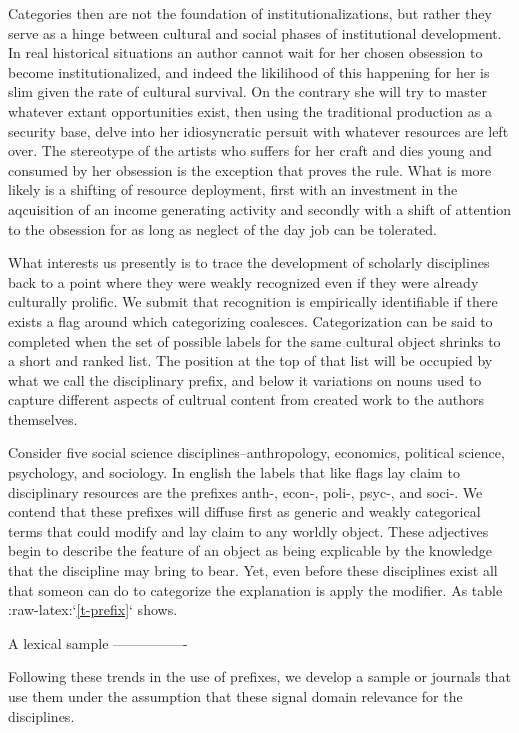 Categories then are not the foundation of institutionalizations, but
rather they serve as a hinge between cultural and social phases of
institutional development. In real historical situations an author
cannot wait for her chosen obsession to become institutionalized, and
indeed the likilihood of this happening for her is slim given the rate
of cultural survival. On the contrary she will try to master whatever
extant opportunities exist, then using the traditional production as a
security base, delve into her idiosyncratic persuit with whatever
resources are left over. The stereotype of the artists who suffers for
her craft and dies young and consumed by her obsession is the exception
that proves the rule. What is more likely is a shifting of resource
deployment, first with an investment in the aqcuisition of an income
generating activity and secondly with a shift of attention to the
obsession for as long as neglect of the day job can be tolerated.

What interests us presently is to trace the development of scholarly
disciplines back to a point where they were weakly recognized even if
they were already culturally prolific. We submit that recognition is
empirically identifiable if there exists a flag around which
categorizing coalesces. Categorization can be said to completed when the
set of possible labels for the same cultural object shrinks to a short
and ranked list. The position at the top of that list will be occupied
by what we call the disciplinary prefix, and below it variations on
nouns used to capture different aspects of cultrual content from created
work to the authors themselves.

Consider five social science disciplines--anthropology, economics,
political science, psychology, and sociology. In english the labels that
like flags lay claim to disciplinary resources are the prefixes anth-,
econ-, poli-, psyc-, and soci-. We contend that these prefixes will
diffuse first as generic and weakly categorical terms that could modify
and lay claim to any worldly object. These adjectives begin to describe
the feature of an object as being explicable by the knowledge that the
discipline may bring to bear. Yet, even before these disciplines exist
all that someon can do to categorize the explanation is apply the
modifier. As table :raw-latex:`\ref{t-prefix}` shows.

A lexical sample
----------------

Following these trends in the use of prefixes, we develop a sample or
journals that use them under the assumption that these signal domain
relevance for the disciplines.

